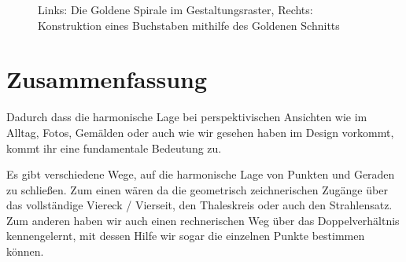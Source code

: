 \documentclass[12pt,a4paper]{article}
\begin{document}
\begin{figure}[htbp]
 \hfill %
\caption{Links: Die Goldene Spirale im Gestaltungsraster, Rechts: Konstruktion eines Buchstaben mithilfe des Goldenen Schnitts}
\end{figure}

\newpage
\section{Zusammenfassung}

Dadurch dass die harmonische Lage bei perspektivischen Ansichten wie im Alltag, Fotos, Gemälden oder auch wie wir gesehen haben im Design vorkommt, kommt ihr eine fundamentale Bedeutung zu.

Es gibt verschiedene Wege, auf die harmonische Lage von Punkten und Geraden zu schließen. Zum einen wären da die geometrisch zeichnerischen Zugänge über das vollständige Viereck / Vierseit, den Thaleskreis oder auch den Strahlensatz. Zum anderen haben wir auch einen rechnerischen Weg über das Doppelverhältnis kennengelernt, mit dessen Hilfe wir sogar die einzelnen Punkte bestimmen können.
\end{document}

